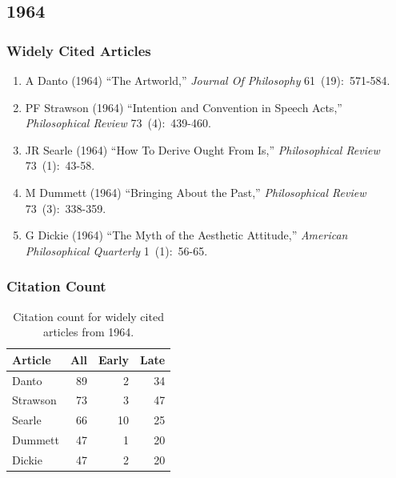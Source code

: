 \documentclass[
  10pt,
  letterpaper,
  DIV=11,
  numbers=noendperiod,
  twoside]{scrartcl}
\providecommand{\tightlist}{%
  \setlength{\itemsep}{0pt}\setlength{\parskip}{0pt}}\usepackage{longtable,booktabs,array}
\begin{document}
\newpage

\subsection{1964}\label{sec-s1964}

\subsubsection*{Widely Cited Articles}\label{widely-cited-articles-8}

\begin{enumerate}
\def\labelenumi{\arabic{enumi}.}
\tightlist
\item
  A Danto (1964) ``The Artworld,'' \emph{Journal Of Philosophy}
  61~(19):~571-584.
\item
  PF Strawson (1964) ``Intention and Convention in Speech Acts,''
  \emph{Philosophical Review} 73~(4):~439-460.
\item
  JR Searle (1964) ``How To Derive Ought From Is,'' \emph{Philosophical
  Review} 73~(1):~43-58.
\item
  M Dummett (1964) ``Bringing About the Past,'' \emph{Philosophical
  Review} 73~(3):~338-359.
\item
  G Dickie (1964) ``The Myth of the Aesthetic Attitude,'' \emph{American
  Philosophical Quarterly} 1~(1):~56-65.
\end{enumerate}

\subsubsection*{Citation Count}\label{sec-count-1964}

\begin{longtable}[]{@{}lrrr@{}}

\caption{\label{tbl-citation-count-1964}Citation count for widely cited
articles from 1964.}

\tabularnewline

\toprule\noalign{}
Article & All & Early & Late \\
\midrule\noalign{}
\endhead
\bottomrule\noalign{}
\endlastfoot
Danto & 89 & 2 & 34 \\
Strawson & 73 & 3 & 47 \\
Searle & 66 & 10 & 25 \\
Dummett & 47 & 1 & 20 \\
Dickie & 47 & 2 & 20 \\

\end{longtable}
\end{document}
